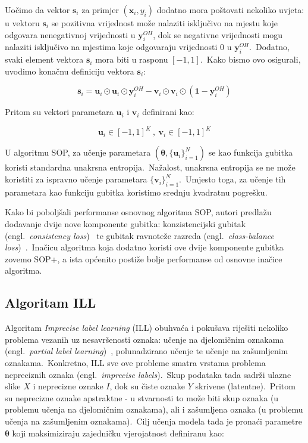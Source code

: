 \documentclass[diplomskirad]{fer}
\begin{document}
Uočimo da vektor $\bm{s}_i$ za primjer $(\bm{x}_i, y_i)$ dodatno mora poštovati nekoliko uvjeta: u vektoru $\bm{s}_i$ se pozitivna vrijednost može nalaziti isključivo na mjestu koje odgovara nenegativnoj vrijednosti u $\bm{y}_i^{OH}$, dok se negativne vrijednosti mogu nalaziti isključivo na mjestima koje odgovaraju vrijednosti $0$ u $\bm{y}_i^{OH}$.\ 
Dodatno, svaki element vektora $\bm{s}_i$ mora biti u rasponu $\left[ -1, 1 \right]$.\ Kako bismo ovo osigurali, uvodimo konačnu definiciju vektora $\bm{s}_i$:

\begin{equation}
  \bm{s}_i = \bm{u}_i \odot \bm{u}_i \odot \bm{y}_i^{OH} - \bm{v}_i \odot \bm{v}_i \odot (\bm{1} - \bm{y}_i^{OH})
  \label{eq:sop_s2}
\end{equation}

Pritom su vektori parametara $\bm{u}_i$ i $\bm{v}_i$ definirani kao:

\begin{equation}
  \bm{u}_i \in \left[ -1, 1 \right]^K\:,\:\bm{v}_i \in \left[ -1, 1 \right]^K
  \label{eq:sop_u,i}
\end{equation}

U algoritmu SOP, za učenje parametara $(\bm{\theta}, \{\bm{u}_i\}_{i=1}^N)$ se kao funkcija gubitka koristi standardna unakrsna entropija.\ Nažalost, unakrsna entropija se ne može koristiti za ispravno učenje parametara $\{\bm{v}_i\}_{i=1}^N$.\ 
Umjesto toga, za učenje tih parametara kao funkciju gubitka koristimo srednju kvadratnu pogrešku.\ 

Kako bi poboljšali performanse osnovnog algoritma SOP, autori predlažu dodavanje dvije nove komponente gubitka: konzistencijski gubitak (engl.\ \textit{consistency loss})~\cite{berthelot2019mixmatch} te gubitak ravnoteže razreda (engl.\ \textit{class-balance loss})~\cite{tanaka2018joint}.\ 
Inačicu algoritma koja dodatno koristi ove dvije komponente gubitka zovemo SOP+, a ista općenito postiže bolje performanse od osnovne inačice algoritma.\

\pagebreak

\subsection{Algoritam ILL}
\label{sub:ill}

Algoritam \textit{Imprecise label learning} (ILL) obuhvaća i pokušava riješiti nekoliko problema vezanih uz nesavršenosti oznaka: učenje na djelomičnim oznakama (engl.\ \textit{partial label learning})~\cite{tian2023partial}, polunadzirano učenje te učenje na zašumljenim oznakama.\ 
Konkretno, ILL sve ove probleme smatra vrstama problema nepreciznih oznaka (engl.\ \textit{imprecise labels}).\ Skup podataka tada sadrži ulazne slike $X$ i neprecizne oznake $I$, dok su čiste oznake $Y$ skrivene (latentne).\ 
Pritom su neprecizne oznake apstraktne - u stvarnosti to može biti skup oznaka (u problemu učenja na djelomičnim oznakama), ali i zašumljena oznaka (u problemu učenja na zašumljenim oznakama).\ 
Cilj učenja modela tada je pronaći parametre $\bm{\theta}$ koji maksimiziraju zajedničku vjerojatnost definiranu kao: 
\end{document}
